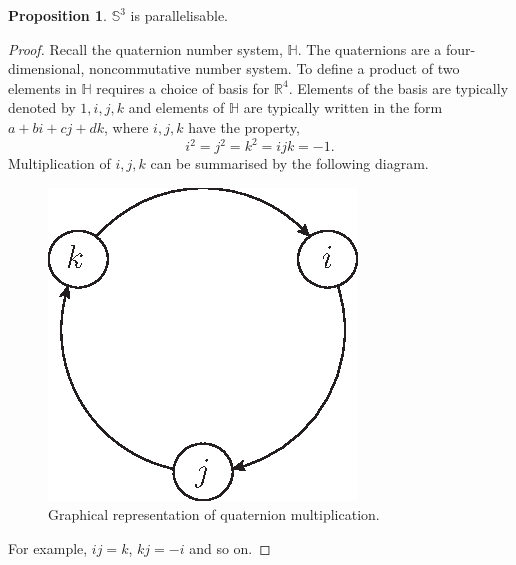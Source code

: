 \documentclass[12pt,a4paper]{article}
\numberwithin{equation}{section}
\theoremstyle{definition}
\newtheorem{proposition}{Proposition}[section]
\theoremstyle{remark}
\begin{document}
\begin{proposition}
$\mathbb{S}^3$ is parallelisable.
\end{proposition}
\begin{proof}
Recall the quaternion number system, $\mathbb{H}$. The quaternions are a four-dimensional, noncommutative number system. To define a product of two elements in $\mathbb{H}$ requires a choice of basis for $\mathbb{R}^4$. Elements of the basis are typically denoted by $1,i,j,k$ and elements of $\mathbb{H}$ are typically written in the form $a+bi+cj+dk$, where $i,j,k$ have the property,
\[
i^2=j^2=k^2=ijk=-1.
\]
Multiplication of $i,j,k$ can be summarised by the following diagram.

\begin{figure}[h!]
\centering
\includegraphics[scale=1]{fig/quat-mult}
\caption{Graphical representation of quaternion multiplication.}
\label{fig:quat-mul}
\end{figure}

For example, $ij=k$, $kj=-i$ and so on.


\end{proof}
\end{document}
